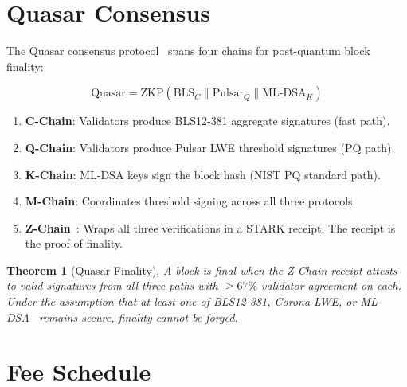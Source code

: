 \documentclass[11pt,a4paper]{article}
\newtheorem{theorem}{Theorem}
\begin{document}
\section{Quasar Consensus}

The Quasar consensus protocol~\cite{lux-consensus} spans four chains for post-quantum block finality:

$$\text{Quasar} = \text{ZKP}\left(\text{BLS}_{C} \parallel \text{Pulsar}_{Q} \parallel \text{ML-DSA}_{K}\right)$$

\begin{enumerate}
\item \textbf{C-Chain}: Validators produce BLS12-381 aggregate signatures (fast path).
\item \textbf{Q-Chain}: Validators produce Pulsar LWE threshold signatures (PQ path).
\item \textbf{K-Chain}: ML-DSA keys sign the block hash (NIST PQ standard path).
\item \textbf{M-Chain}: Coordinates threshold signing across all three protocols.
\item \textbf{Z-Chain}~\cite{lux-zk}: Wraps all three verifications in a STARK receipt. The receipt is the proof of finality.
\end{enumerate}

\begin{theorem}[Quasar Finality]
A block is final when the Z-Chain receipt attests to valid signatures from all three paths with $\geq 67\%$ validator agreement on each. Under the assumption that at least one of BLS12-381, Corona-LWE, or ML-DSA~\cite{lux-pq} remains secure, finality cannot be forged.
\end{theorem}

\section{Fee Schedule}
\end{document}
